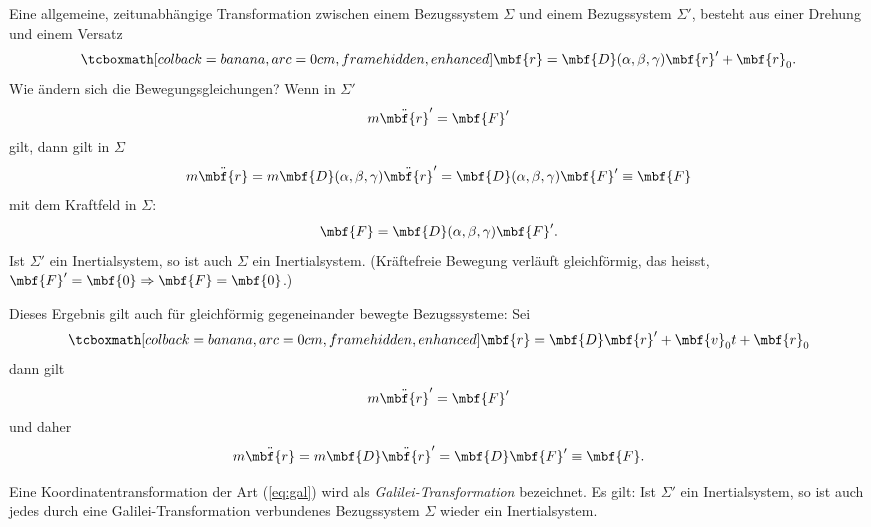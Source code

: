 Eine allgemeine, zeitunabhängige Transformation zwischen einem Bezugssystem $\Sigma$ und einem Bezugssystem $\Sigma'$, besteht aus einer Drehung und einem Versatz
\figbox
\begin{equation}
  \eqbox{\mbf{r} = \mbf{D}(\alpha,\beta,\gamma)\mbf{r}' + \mbf{r}_0.}
\end{equation}
Wie ändern sich die Bewegungsgleichungen? Wenn in $\Sigma'$
\begin{equation}
  m\ddot{\mbf{r}}' = \mbf{F}'
\end{equation}
 gilt, dann gilt in $\Sigma$
\begin{equation}
  m\ddot{\mbf{r}} = m\mbf{D}(\alpha,\beta,\gamma)\ddot{\mbf{r}}' = \mbf{D}(\alpha,\beta,\gamma)\mbf{F}' \equiv \mbf{F}
\end{equation}
mit dem Kraftfeld in $\Sigma$:
\begin{equation}
  \mbf{F} = \mbf{D}(\alpha,\beta,\gamma)\mbf{F}'.
\end{equation}
Ist $\Sigma'$ ein Inertialsystem, so ist auch $\Sigma$ ein Inertialsystem. (Kräftefreie Bewegung verläuft gleichförmig, das heisst, $\mbf{F}'=\mbf{0}\Rightarrow \mbf{F}=\mbf{0}$.)

Dieses Ergebnis gilt auch für gleichförmig gegeneinander bewegte Bezugssysteme: Sei
\begin{equation}\label{eq:gal}
  \eqbox{\mbf{r} = \mbf{D}\mbf{r}' + \mbf{v}_0 t + \mbf{r}_0}
\end{equation}
dann gilt
\begin{equation}
  m\ddot{\mbf{r}}' = \mbf{F}'
\end{equation}
und daher 
\begin{equation}
  m\ddot{\mbf{r}} = m \mbf{D}\ddot{\mbf{r}}' = \mbf{D}\mbf{F}' \equiv \mbf{F}.
\end{equation}

Eine Koordinatentransformation der Art (\ref{eq:gal}) wird als \emph{Galilei-Transformation} bezeichnet. Es gilt: Ist $\Sigma'$ ein Inertialsystem, so ist auch jedes durch eine Galilei-Transformation verbundenes Bezugssystem $\Sigma$ wieder ein Inertialsystem.

